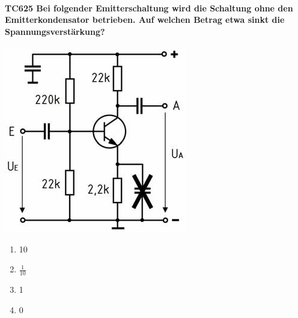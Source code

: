 \documentclass[8pt]{article}
\begin{document}
\begin{enumerate}
\begin{enumerate}[nolistsep,label=\Alph*]
{\begin{enumerate}[nolistsep,label=\Alph*]
\paragraph*{TC625 Bei folgender Emitterschaltung wird die Schaltung ohne den Emitterkondensator betrieben. Auf welchen Betrag etwa sinkt die Spannungsverstärkung?}
\begin{center}
	\begin{minipage}{\linewidth}
		\centering
		\includegraphics[scale=1.0]{pics/tc625_a.jpg}
	\end{minipage}
\end{center}
\begin{enumerate}[nolistsep,label=\Alph*]
\item 10
\item $\frac{1}{10}$
\item 1
\item 0
\end{enumerate}


\end{enumerate}}
\end{enumerate}
\end{enumerate}
\end{document}
